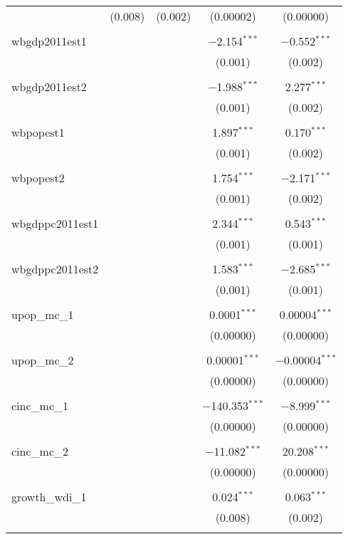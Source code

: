 \begin{table}[!htbp]
\begin{tabular}{@{\extracolsep{5pt}}lcccc}
  & (0.008) & (0.002) & (0.00002) & (0.00000) \\ 
  & & & & \\ 
 wbgdp2011est1 &  &  & $-$2.154$^{***}$ & $-$0.552$^{***}$ \\ 
  &  &  & (0.001) & (0.002) \\ 
  & & & & \\ 
 wbgdp2011est2 &  &  & $-$1.988$^{***}$ & 2.277$^{***}$ \\ 
  &  &  & (0.001) & (0.002) \\ 
  & & & & \\ 
 wbpopest1 &  &  & 1.897$^{***}$ & 0.170$^{***}$ \\ 
  &  &  & (0.001) & (0.002) \\ 
  & & & & \\ 
 wbpopest2 &  &  & 1.754$^{***}$ & $-$2.171$^{***}$ \\ 
  &  &  & (0.001) & (0.002) \\ 
  & & & & \\ 
 wbgdppc2011est1 &  &  & 2.344$^{***}$ & 0.543$^{***}$ \\ 
  &  &  & (0.001) & (0.001) \\ 
  & & & & \\ 
 wbgdppc2011est2 &  &  & 1.583$^{***}$ & $-$2.685$^{***}$ \\ 
  &  &  & (0.001) & (0.001) \\ 
  & & & & \\ 
 upop\_mc\_1 &  &  & 0.0001$^{***}$ & 0.00004$^{***}$ \\ 
  &  &  & (0.00000) & (0.00000) \\ 
  & & & & \\ 
 upop\_mc\_2 &  &  & 0.00001$^{***}$ & $-$0.00004$^{***}$ \\ 
  &  &  & (0.00000) & (0.00000) \\ 
  & & & & \\ 
 cinc\_mc\_1 &  &  & $-$140.353$^{***}$ & $-$8.999$^{***}$ \\ 
  &  &  & (0.00000) & (0.00000) \\ 
  & & & & \\ 
 cinc\_mc\_2 &  &  & $-$11.082$^{***}$ & 20.208$^{***}$ \\ 
  &  &  & (0.00000) & (0.00000) \\ 
  & & & & \\ 
 growth\_wdi\_1 &  &  & 0.024$^{***}$ & 0.063$^{***}$ \\ 
  &  &  & (0.008) & (0.002) \\ 
  & & & & \\ 

\end{tabular}
\end{table}
